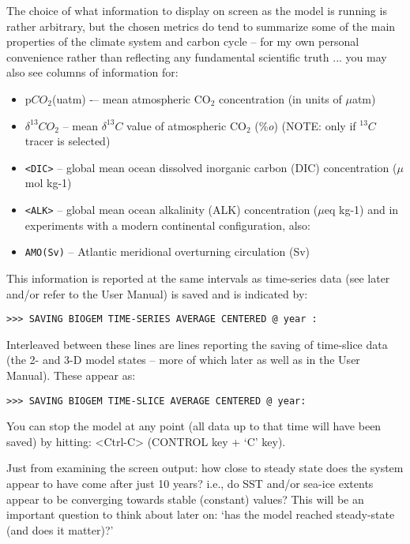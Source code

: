 \documentclass[11pt,fleqn]{book} %
\begin{document}
The choice of what information to display on screen as the model is running is rather arbitrary, but the chosen metrics do tend to summarize some of the main properties of the climate system and carbon cycle – for my own personal convenience rather than reflecting any fundamental scientific truth ... you may also see columns of information for:

\begin{itemize}
\item[] p\(CO_{2}\)(uatm) -– mean atmospheric CO\(_{2}\) concentration (in units of \(\mu\)atm)
\item[] \(\delta^{13}CO_{2}\)  – mean \(\delta^{13}C\) value of atmospheric CO\(_{2}\) (\%\textit{o}) (NOTE: only if \(^{13}C\) tracer is selected)
\item[] \texttt{<DIC>} -- global mean ocean dissolved inorganic carbon (DIC) concentration (\(\mu\)mol kg-1)
\item[] \texttt{<ALK>}   – global mean ocean alkalinity (ALK) concentration (\(\mu\)eq kg-1) and in experiments with a modern continental configuration, also:
\item \texttt{AMO(Sv)} -- Atlantic meridional overturning circulation (Sv)
\end{itemize}

This information is reported at the same intervals as time-series data (see later and/or refer to the User Manual) is saved and is indicated by:

\vspace{-2mm}
\begin{verbatim}
>>> SAVING BIOGEM TIME-SERIES AVERAGE CENTERED @ year :
\end{verbatim}
\vspace{-2mm}

Interleaved between these lines are lines reporting the saving of time-slice data (the 2- and 3-D model states – more of which later as well as in the User Manual). These appear as:

\vspace{-2mm}
\begin{verbatim}
>>> SAVING BIOGEM TIME-SLICE AVERAGE CENTERED @ year:
\end{verbatim}
\vspace{-2mm}

You can stop the model at any point (all data up to that time will have been saved) by hitting: \textsf{<Ctrl-C>} (\textsf{CONTROL} key + ‘\textsf{C}’ key).

Just from examining the screen output: how close to steady state does the system appear to have come after just 10 years? i.e., do SST and/or sea-ice extents appear to be converging towards stable (constant) values? This will be an important question to think about later on: ‘has the model reached steady-state (and does it matter)?’
\end{document}
